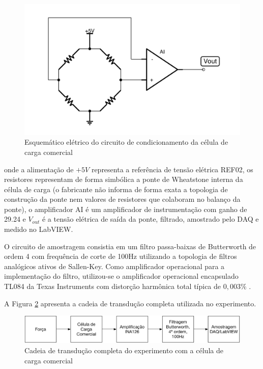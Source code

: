 \documentclass[a4paper]{instrumentacao}
\begin{document}
\begin{figure}[H]
\center
\includegraphics[width=\textwidth]{Comercial-Circuito.pdf}
\caption{Esquemático elétrico do circuito de condicionamento da célula de carga comercial}
\label{fig:celula-comercial-metodologia-condicionamento}
\end{figure}

\noindent onde a alimentação de $+5V$ representa a referência de tensão elétrica REF02, os resistores representam de forma simbólica a ponte de Wheatstone interna da célula de carga (o fabricante não informa de forma exata a topologia de construção da ponte nem valores de resistores que colaboram no balanço da ponte), o amplificador AI é um amplificador de instrumentação com ganho de 29.24 e $V_{out}$ é a tensão elétrica de saída da ponte, filtrado, amostrado pelo DAQ e medido no LabVIEW.

O circuito de amostragem consistia em um filtro passa-baixas de Butterworth de ordem 4 com frequência de corte de 100Hz utilizando a topologia de filtros analógicos ativos de Sallen-Key. Como amplificador operacional para a implementação do filtro, utilizou-se o amplificador operacional encapsulado TL084 da Texas Instruments com distorção harmônica total típica de $0,003\%$ \cite{datasheet-tl084}.

A Figura \ref{fig:celula-comercial-cadeia-transducao} apresenta a cadeia de transdução completa utilizada no experimento.

\begin{figure}[H]
\center
\includegraphics[width=\textwidth]{Comercial-Cadeia-Transducao.pdf}
\caption{Cadeia de transdução completa do experimento com a célula de carga comercial}
\label{fig:celula-comercial-cadeia-transducao}
\end{figure}
\end{document}
